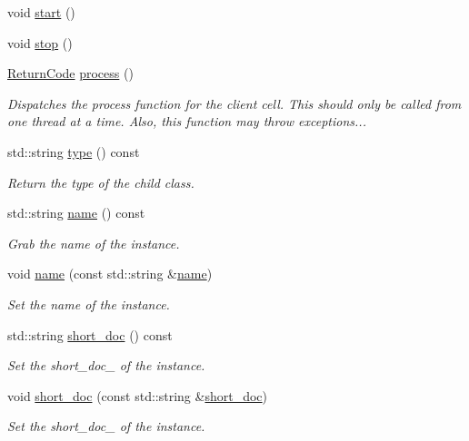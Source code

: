 \begin{DoxyCompactItemize}
void \hyperlink{structecto_1_1cell_a06abb010763ff7aeaaf2b28be4a6424a}{start} ()
\item 
void \hyperlink{structecto_1_1cell_abac52b774d350b02dc99a55c64b94bcd}{stop} ()
\item 
\hyperlink{namespaceecto_a93d82cd28db695d53963fb696582762c}{\-Return\-Code} \hyperlink{structecto_1_1cell_a6b810671ee21f5dddbc1206abfb999f3}{process} ()
\begin{DoxyCompactList}\small\item\em \-Dispatches the process function for the client cell. \-This should only be called from one thread at a time. \-Also, this function may throw exceptions... \end{DoxyCompactList}\item 
std\-::string \hyperlink{structecto_1_1cell_ae3b84af61e78dab25f66a66773d5c5df}{type} () const 
\begin{DoxyCompactList}\small\item\em \-Return the type of the child class. \end{DoxyCompactList}\item 
std\-::string \hyperlink{structecto_1_1cell_a931fbc02fff66a58684ab25e00dbb2f8}{name} () const 
\begin{DoxyCompactList}\small\item\em \-Grab the name of the instance. \end{DoxyCompactList}\item 
void \hyperlink{structecto_1_1cell_a3956efb238f50a6983b86f430c47ca05}{name} (const std\-::string \&\hyperlink{structecto_1_1cell_a931fbc02fff66a58684ab25e00dbb2f8}{name})
\begin{DoxyCompactList}\small\item\em \-Set the name of the instance. \end{DoxyCompactList}\item 
std\-::string \hyperlink{structecto_1_1cell_aefa443962201caebb08d1a3163730639}{short\-\_\-doc} () const 
\begin{DoxyCompactList}\small\item\em \-Set the short\-\_\-doc\-\_\- of the instance. \end{DoxyCompactList}\item 
void \hyperlink{structecto_1_1cell_a49d510eec19d352c5729e6a2fd149340}{short\-\_\-doc} (const std\-::string \&\hyperlink{structecto_1_1cell_aefa443962201caebb08d1a3163730639}{short\-\_\-doc})
\begin{DoxyCompactList}\small\item\em \-Set the short\-\_\-doc\-\_\- of the instance. \end{DoxyCompactList}\item 

\end{DoxyCompactItemize}
